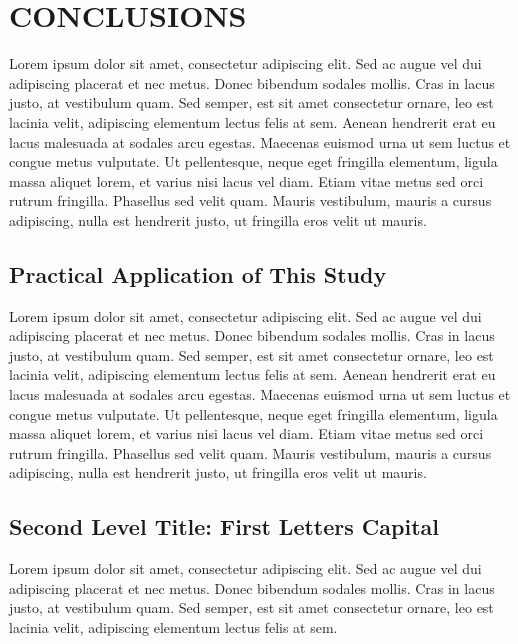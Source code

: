 \chapter{CONCLUSIONS}\label{ch:ch6}

Lorem ipsum dolor sit amet, consectetur adipiscing elit. Sed ac augue vel dui 
a\-di\-pi\-scing pla\-ce\-rat et nec me\-tus. Donec bibendum sodales mollis. Cras in lacus 
justo, at vestibulum quam. Sed semper, est sit amet consectetur ornare, leo est 
lacinia velit, adipiscing elementum lectus felis at sem. Aenean hendrerit erat eu 
lacus malesuada at sodales arcu egestas. Maecenas euismod urna ut sem luctus et 
congue metus vulputate. Ut pellentesque, neque eget fringilla elementum, ligula 
massa aliquet lorem, et varius nisi lacus vel diam. Etiam vitae metus sed orci 
rutrum fringilla. Phasellus sed velit quam. Mauris vestibulum, mauris a cursus 
adipiscing, nulla est hendrerit justo, ut fringilla eros velit ut mauris.

\section{Practical Application of This Study}

Lorem ipsum dolor sit amet, consectetur adipiscing elit. Sed ac augue vel dui 
adipiscing placerat et nec metus. Donec bibendum sodales mollis. Cras in lacus 
justo, at vestibulum quam. Sed semper, est sit amet consectetur ornare, leo est 
lacinia velit, adipiscing elementum lectus felis at sem. Aenean hendrerit erat eu 
lacus malesuada at sodales arcu egestas. Maecenas euismod urna ut sem luctus et 
congue metus vulputate. Ut pellentesque, neque eget fringilla elementum, ligula 
massa aliquet lorem, et varius nisi lacus vel diam. Etiam vitae metus sed orci 
rutrum fringilla. Phasellus sed velit quam. Mauris vestibulum, mauris a cursus 
adipiscing, nulla est hendrerit justo, ut fringilla eros velit ut mauris.

\section{Second Level Title: First Letters Capital}

Lorem ipsum dolor sit amet, consectetur adipiscing elit. Sed ac augue vel dui 
adipiscing placerat et nec metus. Donec bibendum sodales mollis. Cras in lacus 
justo, at vestibulum quam. Sed semper, est sit amet consectetur ornare, leo est 
lacinia velit, adipiscing elementum lectus felis at sem. 

